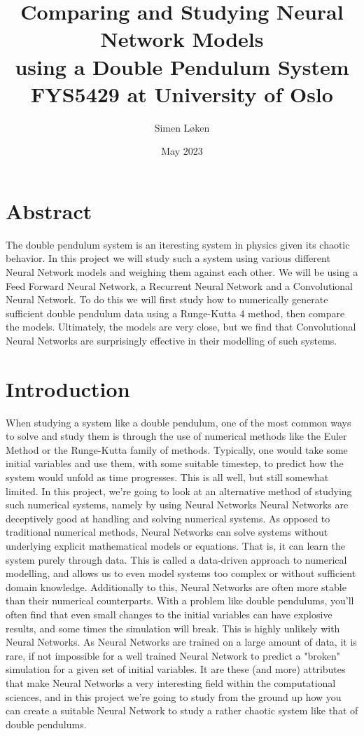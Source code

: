 \documentclass{article}
\title{%
Comparing and Studying Neural Network Models \\
using a Double Pendulum System \\
\large FYS5429 at University of Oslo}
\author{Simen Løken}
\date{May 2023}
\begin{document}
\nocite{*}
\maketitle
{
  \hypersetup{linkcolor=black}
  \tableofcontents
}\newpage
\section{Abstract}
The double pendulum system is an iteresting system in physics given its chaotic behavior. In this project we will study such a system using various different Neural Network models and weighing them against each other. We will be using a Feed Forward Neural Network, a Recurrent Neural Network and a Convolutional Neural Network. To do this we will first study how to numerically generate sufficient double pendulum data using a Runge-Kutta 4 method, then compare the models. Ultimately, the models are very close, but we find that Convolutional Neural Networks are surprisingly effective in their modelling of such systems.
\section{Introduction}
When studying a system like a double pendulum, one of the most common ways to solve and study them is through the use of numerical methods like the Euler Method or the Runge-Kutta family of methods. Typically, one would take some initial variables and use them, with some suitable timestep, to predict how the system would unfold as time progresses. This is all well, but still somewhat limited. In this project, we're going to look at an alternative method of studying such numerical systems, namely by using Neural Networks \newline
Neural Networks are deceptively good at handling and solving numerical systems. As opposed to traditional numerical methods, Neural Networks can solve systems without underlying explicit mathematical models or equations. That is, it can learn the system purely through data. This is called a data-driven approach to numerical modelling, and allows us to even model systems too complex or without sufficient domain knowledge. \newline
Additionally to this, Neural Networks are often more stable than their numerical counterparts. With a problem like double pendulums, you'll often find that even small changes to the initial variables can have explosive results, and some times the simulation will break. This is highly unlikely with Neural Networks. As Neural Networks are trained on a large amount of data, it is rare, if not impossible for a well trained Neural Network to predict a "broken" simulation for a given set of initial variables.\newline
It are these (and more) attributes that make Neural Networks a very interesting field within the computational sciences, and in this project we're going to study from the ground up how you can create a suitable Neural Network to study a rather chaotic system like that of double pendulums.
\end{document}
